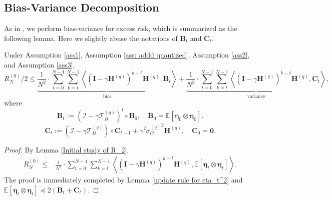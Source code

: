 \documentclass[11pt, letterpaper]{article}
\begin{document}
\subsection{Bias-Variance Decomposition}
\label{Bias-Variance Decomposition}
As in \citet{zou2023benign}, we perform bias-variance for excess risk, which is summarized as the following lemma. Here we slightly abuse the notations of $\mathbf{B}_t$ and $\mathbf{C}_t$.
\begin{lemma}
\label{Bias-Variance Decomposition under General Quantization}
    Under Assumption \ref{ass1}, Assumption \ref{ass: addd quantized}, Assumption \ref{ass2}, and Assumption \ref{ass3},
    \begin{equation*}
        R_N^{(0)}/2\leq \underbrace{\frac{1}{N^2}\cdot\sum_{t=0}^{N-1}\sum_{k=t}^{N-1}\left\langle(\mathbf{I}-\gamma\mathbf{H}^{(q)})^{k-t}\mathbf{H}^{(q)},\mathbf{B}_t\right\rangle}_{\mathrm{bias}}+\underbrace{\frac{1}{N^2}\cdot\sum_{t=0}^{N-1}\sum_{k=t}^{N-1}\left\langle(\mathbf{I}-\gamma\mathbf{H}^{(q)})^{k-t}\mathbf{H}^{(q)},\mathbf{C}_t\right\rangle}_{\mathrm{variance}},
    \end{equation*}
    where
    \begin{equation*}
        \mathbf{B}_t:=(\mathcal{I}-\gamma\mathcal{T}_B^{(q)})^t \circ \mathbf{B}_0, \quad \mathbf{B}_0=\mathbb{E}\left[\boldsymbol{\eta}_0 \otimes \boldsymbol{\eta}_0\right].
    \end{equation*}
    \begin{equation*}
        \mathbf{C}_t := (\mathcal{I}-\gamma \mathcal{T}_B^{(q)})\circ\mathbf{C}_{t-1}+\gamma^2 {\sigma_G^{(q)}}^2\mathbf{H}^{(q)},\quad \mathbf{C}_0=\boldsymbol{0}.
    \end{equation*}
\end{lemma}
\begin{proof}
    By Lemma \ref{Initial study of R_2},
    \begin{equation*}
        \begin{aligned}
            R_N^{(0)}\leq &\frac{1}{N^2}\cdot\sum_{t=0}^{N-1}\sum_{k=t}^{N-1}\left\langle(\mathbf{I}-\gamma\mathbf{H}^{(q)})^{k-t}\mathbf{H}^{(q)},\mathbb{E}[\boldsymbol{\eta}_t\otimes \boldsymbol{\eta}_t]\right\rangle.
        \end{aligned}
    \end{equation*}
    The proof is immediately completed by Lemma \ref{update rule for eta_t^2} and $\mathbb{E}[\boldsymbol{\eta}_t\otimes \boldsymbol{\eta}_t]\preceq 2(\mathbf{B}_t+\mathbf{C}_t).$
\end{proof}
\end{document}
